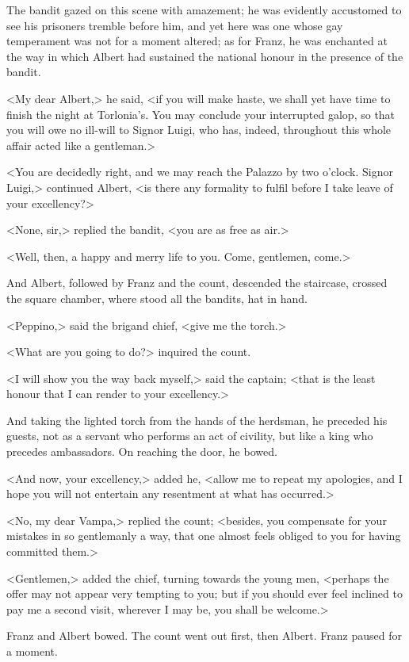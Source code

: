 The bandit gazed on this scene with amazement; he was evidently accustomed to see his prisoners tremble before him, and yet here was one whose gay temperament was not for a moment altered; as for Franz, he was enchanted at the way in which Albert had sustained the national honour in the presence of the bandit. 

 <My dear Albert,> he said, <if you will make haste, we shall yet have time to finish the night at Torlonia's. You may conclude your interrupted galop, so that you will owe no ill-will to Signor Luigi, who has, indeed, throughout this whole affair acted like a gentleman.> 

 <You are decidedly right, and we may reach the Palazzo by two o'clock. Signor Luigi,> continued Albert, <is there any formality to fulfil before I take leave of your excellency?> 

 <None, sir,> replied the bandit, <you are as free as air.> 

 <Well, then, a happy and merry life to you. Come, gentlemen, come.> 

 And Albert, followed by Franz and the count, descended the staircase, crossed the square chamber, where stood all the bandits, hat in hand. 

 <Peppino,> said the brigand chief, <give me the torch.> 

 <What are you going to do?> inquired the count. 

 <I will show you the way back myself,> said the captain; <that is the least honour that I can render to your excellency.> 

 And taking the lighted torch from the hands of the herdsman, he preceded his guests, not as a servant who performs an act of civility, but like a king who precedes ambassadors. On reaching the door, he bowed. 

 <And now, your excellency,> added he, <allow me to repeat my apologies, and I hope you will not entertain any resentment at what has occurred.> 

 <No, my dear Vampa,> replied the count; <besides, you compensate for your mistakes in so gentlemanly a way, that one almost feels obliged to you for having committed them.>

<Gentlemen,> added the chief, turning towards the young men, <perhaps the offer may not appear very tempting to you; but if you should ever feel inclined to pay me a second visit, wherever I may be, you shall be welcome.> 

 Franz and Albert bowed. The count went out first, then Albert. Franz paused for a moment. 

